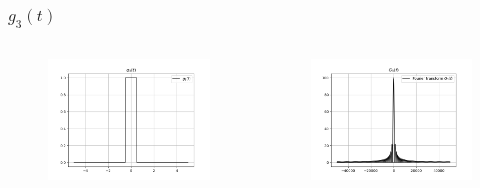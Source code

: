 \documentclass{beamer}
\begin{document}
\begin{frame}
  \frametitle{$g_3(t)$}
 \begin{columns}
\begin{column}{0.5\textwidth}
\begin{figure}
\begin{flushleft}
\includegraphics[width=\columnwidth]{graphs/g3.png}

\end{flushleft}
\end{figure}
\end{column}
\begin{column}{0.5\textwidth}
\begin{figure}
\begin{flushleft}
\includegraphics[width=\columnwidth]{graphs/fourier_g3.png}

\end{flushleft}
\end{figure}
\end{column}
\end{columns}
\end{frame}
\end{document}
